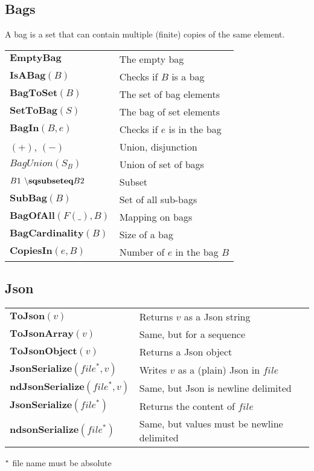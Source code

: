\documentclass[10pt,landscape]{article}
\begin{document}
\begin{multicols}{3}
{    \subsection{Bags}
    A bag is a set that can contain multiple (finite) copies of the same
    element.
    \begin{tabular}{p{}|p{}}
      $\textbf{EmptyBag}$ & The empty bag \\
      $\textbf{IsABag}(B)$ & Checks if $B$ is a bag\\
      $\textbf{BagToSet}(B)$ & The set of bag elements\\
      $\textbf{SetToBag}(S)$ & The bag of set elements\\
      $\textbf{BagIn}(B,e)$ & Checks if $e$ is in the bag\\
      $(+)$, $(-)$ & Union, disjunction\\
      $BagUnion(S_B)$ & Union of set of bags\\
      $B1 \textbf{$~\backslash$sqsubseteq} B2$ & Subset\\
      $\textbf{SubBag}(B)$ & Set of all sub-bags\\
      $\textbf{BagOfAll}(F(\_), B)$ & Mapping on bags\\
      $\textbf{BagCardinality}(B)$ & Size of a bag\\
      $\textbf{CopiesIn}(e, B)$ & Number of $e$ in the bag $B$
    \end{tabular}
    \subsection{Json}
    \begin{tabular}{p{}|p{}}
      $\textbf{ToJson}(v)$ & Returns $v$ as a Json string\\
      $\textbf{ToJsonArray}(v)$ & Same, but for a sequence\\
      $\textbf{ToJsonObject}(v)$ & Returns a Json object\\
      $\textbf{JsonSerialize}(file^*, v)$ & Writes $v$ as a (plain) Json in $file$\\
      $\textbf{ndJsonSerialize}(file^*, v)$ & Same, but Json is newline delimited\\
      $\textbf{JsonSerialize}(file^*)$ & Returns the content of $file$\\
      $\textbf{ndsonSerialize}(file^*)$ & Same, but values must be newline delimited\\
    \end{tabular}
    $\null^*$ file name must be absolute
  }
  

\end{multicols}
\end{document}
